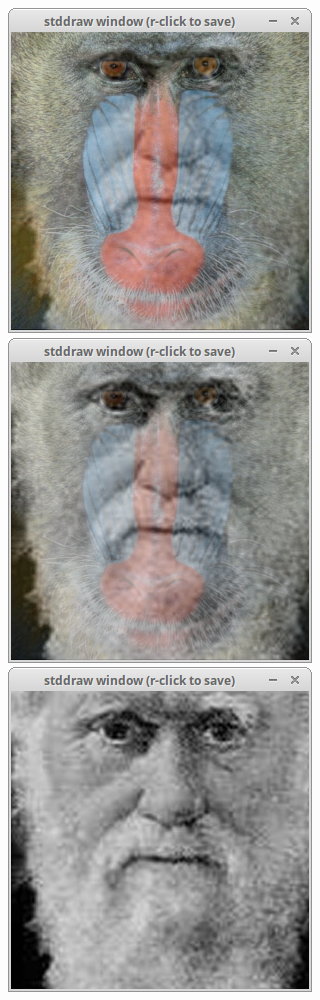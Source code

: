 \documentclass[8pt,a4paper,compress]{beamer}
\begin{document}
\begin{frame}[fragile]
\begin{minipage}{300pt}
{\begin{center}
\includegraphics[scale=0.15]{figures/fade4.png}\hfill
\includegraphics[scale=0.15]{figures/fade5.png}\hfill
\includegraphics[scale=0.15]{figures/fade6.png}
\end{center}}
\end{minipage}%
\end{frame}
\end{document}
